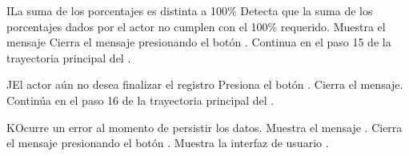 
\begin{UCtrayectoriaA}{I}{La suma de los porcentajes es distinta a 100\%}
    \UCpaso Detecta que la suma de los porcentajes dados por el actor no cumplen con el 100\% requerido.
    \UCpaso Muestra el mensaje 
    \UCpaso[\UCactor] Cierra el mensaje presionando el botón .
    \UCpaso Continua en el paso 15 de la trayectoria principal del .
\end{UCtrayectoriaA}


\begin{UCtrayectoriaA}{J}{El actor aún no desea finalizar el registro}
	\UCpaso[\UCactor] Presiona el botón .
	\UCpaso Cierra el mensaje.
	\UCpaso Continúa en el paso 16 de la trayectoria principal del .
\end{UCtrayectoriaA}


\begin{UCtrayectoriaA}{K}{Ocurre un error al momento de persistir los datos.}
	\UCpaso Muestra el mensaje .
	\UCpaso[\UCactor] Cierra el mensaje presionando el botón .
	\UCpaso Muestra la interfaz de usuario .
\end{UCtrayectoriaA}